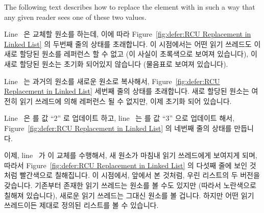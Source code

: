 The following text describes how to replace the  element
with  in such a way that any given reader sees one of these
two values.
\fi

\begin{lineref}
Line~ 은 교체할 원소를  하는데, 이에 따라
Figure~\ref{fig:defer:RCU Replacement in Linked List} 의 두번째 줄의 상태를
초래합니다.
이 시점에서는 어떤 읽기 쓰레드도 이 새로 할당된 원소를 레퍼런스 할 수 없고 (이
사실이 초록색으로 보여져 있습니다), 이 새로 할당된 원소는 초기화 되어있지
않습니다 (물음표로 보여져 있습니다).

Line~ 는 과거의 원소를 새로운 원소로 복사해서,
Figure~\ref{fig:defer:RCU Replacement in Linked List} 세번째 줄의 상태를
초래합니다.
새로 할당된 원소는 여전히 읽기 쓰레드에 의해 레퍼런스 될 수 없지만, 이제 초기화
되어 있습니다.

Line~ 은  를 값 ``2'' 로 업데이트 하고,
line~ 는  를 값 ``3'' 으로 업데이트 해서,
Figure~\ref{fig:defer:RCU Replacement in Linked List} 의 네번째 줄의 상태를
만듭니다.

이제, line~ 가 이 교체를 수행해서, 새 원소가 마침내 읽기
쓰레드에게 보여지게 되며, 따라서
Figure~\ref{fig:defer:RCU Replacement in Linked List} 의 다섯째 줄에 보인
것처럼 빨간색으로 칠해집니다.
이 시점에서, 앞에서 본 것처럼, 우린 리스트의 두 버전을 갖습니다.
기존부터 존재한 읽기 쓰레드는  원소를 볼 수도 있지만 (따라서
노란색으로 칠해져 있습니다), 새로운 읽기 쓰레드는 그대신  원소를 볼
겁니다.
하지만 어떤 읽기 쓰레드이든 제대로 정의된 리스트를 볼 수 있습니다.
\iffalse


\end{lineref}

